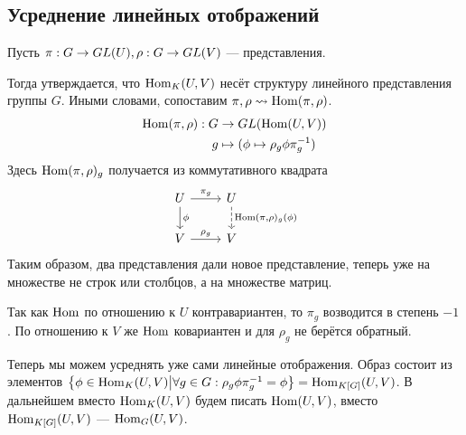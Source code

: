 \subsection{Усреднение линейных отображений}
Пусть $\pi: G \rightarrow GL(U), \rho: G \rightarrow GL(V)$ --- представления.

Тогда утверждается, что $\operatorname{Hom}_K(U, V)$ несёт структуру линейного представления группы $G$.
Иными словами, сопоставим $\pi, \rho \rightsquigarrow \operatorname{Hom}(\pi, \rho)$.
\begin{align*}
    \operatorname{Hom}(\pi, \rho): G & \rightarrow GL(\operatorname{Hom}(U, V)) \\ g &\mapsto (\phi \mapsto \rho_g \phi \pi_g^{-1})
\end{align*}
Здесь $\operatorname{Hom}(\pi, \rho)_g$ получается из коммутативного квадрата
\[\begin{tikzcd}[ampersand replacement=\&]
      U \& U \\
      V \& V
      \arrow["{\pi_g}", from=1-1, to=1-2]
      \arrow["{\rho_g}", from=2-1, to=2-2]
      \arrow["\phi", from=1-1, to=2-1]
      \arrow["{\Hom(\pi, \rho)_g(\phi)}", dashed, from=1-2, to=2-2]
\end{tikzcd}\]
Таким образом, два представления дали новое представление, теперь уже на множестве не строк или столбцов, а на множестве матриц.

Так как $\operatorname{Hom}$ по отношению к $U$ контравариантен, то $\pi_g$ возводится в степень $-1$.
По отношению к $V$ же $\operatorname{Hom}$ ковариантен и для $\rho_g$ не берётся обратный.

Теперь мы можем усреднять уже сами линейные отображения.
Образ состоит из элементов $\left\{\phi \in \operatorname{Hom}_K(U, V)\middle|\forall g \in G: \rho_g \phi \pi_g^{-1} = \phi\right\} = \operatorname{Hom}_{K[G]}(U, V)$.
В дальнейшем вместо $\operatorname{Hom}_K(U, V)$ будем писать $\operatorname{Hom}(U, V)$, вместо $\operatorname{Hom}_{K[G]}(U, V)$ --- $\operatorname{Hom}_G(U, V)$.


